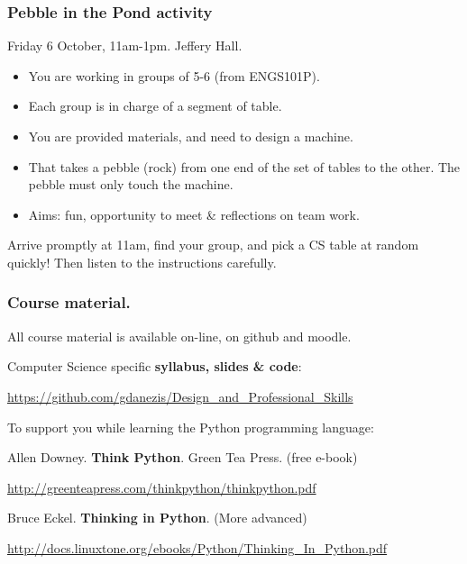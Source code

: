 \documentclass{beamer} %
\newcommand\emc[1]{\textcolor{brightblue}{\textbf{#1}}}
\begin{document}
\begin{frame}
\frametitle{Pebble in the Pond activity} 

Friday 6 October, 11am-1pm. Jeffery Hall.

\begin{itemize}
	\item You are working in groups of 5-6 (from ENGS101P).
	\item Each group is in charge of a segment of table.
	\item You are provided materials, and need to design a machine.
	\item That takes a pebble (rock) from one end of the set of tables to the other. The pebble must only touch the machine.
	\item Aims: fun, opportunity to meet \& reflections on team work.
\end{itemize}

Arrive promptly at 11am, find your group, and pick a CS table at random quickly! Then listen to the instructions carefully.

\end{frame}

\begin{frame}
\frametitle{Course material.} 

All course material is available on-line, on github and moodle.

\vspace{7mm}
Computer Science specific \emc{syllabus, slides \& code}: 

\url{https://github.com/gdanezis/Design_and_Professional_Skills}

\vspace{7mm}
To support you while learning the Python programming language:

\vspace{2mm}
Allen Downey. \emc{Think Python}. Green Tea Press. (free e-book)

{\small \url{http://greenteapress.com/thinkpython/thinkpython.pdf} }

\vspace{2mm}
Bruce Eckel. \emc{Thinking in Python}. (More advanced)

{\small \url{http://docs.linuxtone.org/ebooks/Python/Thinking_In_Python.pdf} }


\end{frame}
\end{document}
